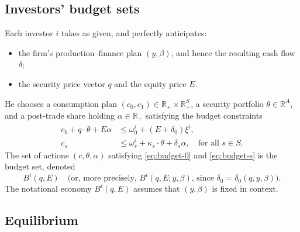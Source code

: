 \documentclass[11pt,a4paper,oneside]{book}
\def\R{\mathbb{R}}
\def\leq{\leqslant}
\theoremstyle{plain}
\theoremstyle{definition}
\theoremstyle{remark}
\numberwithin{equation}{chapter}
\begin{document}
\subsection{Investors' budget sets}

Each investor $i$ takes as given, and perfectly anticipates:
\begin{itemize}
  \item the firm's production--finance plan $(y, \beta)$, and hence the resulting cash flow $\delta$;
  \item the security price vector $q$ and the equity price $E$.
\end{itemize}
He chooses a consumption plan $(c_0, c_1) \in \R_+ \times \R_+^S$, a security portfolio $\theta \in \R^A$, and a post-trade share holding $\alpha \in \R_+$ satisfying the budget constraints
\begin{align}
  c_0 + q \cdot \theta + E \alpha &\leq \omega^i_0 + (E + \delta_0) \xi^i,
  \label{eq:budget-0}\\[2pt]
  c_s &\leq \omega^i_s + \kappa_s \cdot \theta + \delta_s \alpha,
  \quad \text{for all $s\in S$}.
  \label{eq:budget-s}
\end{align}
The set of actions $(c, \theta, \alpha)$ satisfying \eqref{eq:budget-0} and \eqref{eq:budget-s} is the budget set, denoted
\begin{equation*}
  B^i(q, E) \quad \text{(or, more precisely, } B^i(q, E; y, \beta) \text{, since } \delta_0 = \delta_0(q, y, \beta) \text{).}
\end{equation*}
The notational economy $B^i(q, E)$ assumes that $(y, \beta)$ is fixed in context.

\subsection{Equilibrium}
\end{document}
